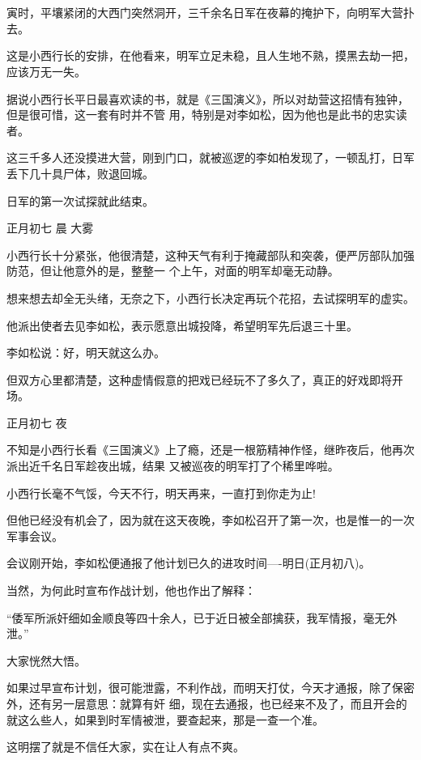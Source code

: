 \documentclass[11pt,a4paper,onecolumn]{article}
\begin{document}
\section[\thesection]{}

寅时，平壤紧闭的大西门突然洞开，三千余名日军在夜幕的掩护下，向明军大营扑去。

这是小西行长的安排，在他看来，明军立足未稳，且人生地不熟，摸黑去劫一把，应该万无一失。

据说小西行长平日最喜欢读的书，就是《三国演义》，所以对劫营这招情有独钟，但是很可惜，这一套有时并不管
用，特别是对李如松，因为他也是此书的忠实读者。

这三千多人还没摸进大营，刚到门口，就被巡逻的李如柏发现了，一顿乱打，日军丢下几十具尸体，败退回城。

日军的第一次试探就此结束。

正月初七 晨 大雾

小西行长十分紧张，他很清楚，这种天气有利于掩藏部队和突袭，便严厉部队加强防范，但让他意外的是，整整一
个上午，对面的明军却毫无动静。

想来想去却全无头绪，无奈之下，小西行长决定再玩个花招，去试探明军的虚实。

他派出使者去见李如松，表示愿意出城投降，希望明军先后退三十里。

李如松说：好，明天就这么办。

但双方心里都清楚，这种虚情假意的把戏已经玩不了多久了，真正的好戏即将开场。

正月初七 夜

不知是小西行长看《三国演义》上了瘾，还是一根筋精神作怪，继昨夜后，他再次派出近千名日军趁夜出城，结果
又被巡夜的明军打了个稀里哗啦。

小西行长毫不气馁，今天不行，明天再来，一直打到你走为止!

但他已经没有机会了，因为就在这天夜晚，李如松召开了第一次，也是惟一的一次军事会议。

会议刚开始，李如松便通报了他计划已久的进攻时间----明日(正月初八)。

当然，为何此时宣布作战计划，他也作出了解释：

``倭军所派奸细如金顺良等四十余人，已于近日被全部擒获，我军情报，毫无外泄。''

大家恍然大悟。

如果过早宣布计划，很可能泄露，不利作战，而明天打仗，今天才通报，除了保密外，还有另一层意思：就算有奸
细，现在去通报，也已经来不及了，而且开会的就这么些人，如果到时军情被泄，要查起来，那是一查一个准。

这明摆了就是不信任大家，实在让人有点不爽。
\end{document}
